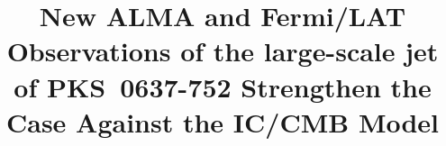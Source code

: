 \documentclass[twocolumn]{aastex61}
\begin{document}
\title{New ALMA and Fermi/LAT Observations of the large-scale jet of PKS~0637-752 Strengthen the Case Against the IC/CMB Model}


\end{document}
